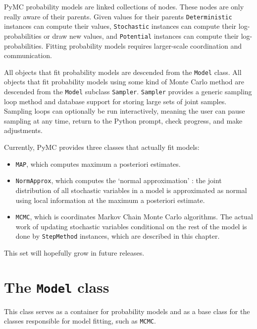 PyMC probability models are linked collections of nodes. These nodes are only really aware of their parents. Given values for their parents \texttt{Deterministic} instances can compute their values, \texttt{Stochastic} instances can compute their log-probabilities or draw new values, and \texttt{Potential} instances can compute their log-probabilities. Fitting probability models requires larger-scale coordination and communication.

All objects that fit probability models are descended from the \texttt{Model} class. All objects that fit probability models using some kind of Monte Carlo method are descended from the \texttt{Model} subclass \texttt{Sampler}. \texttt{Sampler} provides a generic sampling loop method and database support for storing large sets of joint samples. Sampling loops can optionally be run interactively, meaning the user can pause sampling at any time, return to the Python prompt, check progress, and make adjustments.

Currently, PyMC provides three classes that actually fit models:
\begin{itemize}
    \item \texttt{MAP}, which computes maximum a posteriori estimates.
    \item \texttt{NormApprox}, which computes the `normal approximation' \cite{gelman}: the joint distribution of all stochastic variables in a model is approximated as normal using local information at the maximum a posteriori estimate.
    \item \texttt{MCMC}, which is coordinates Markov Chain Monte Carlo algorithms. The actual work of updating stochastic variables conditional on the rest of the model is done by \texttt{StepMethod} instances, which are described in this chapter.
\end{itemize}
This set will hopefully grow in future releases. 


\hypertarget{model}{}
\section*{The \texttt{Model} class} \label{sec:Model}
This class serves as a container for probability models and as a base class for the classes responsible for model fitting, such as \texttt{MCMC}.

